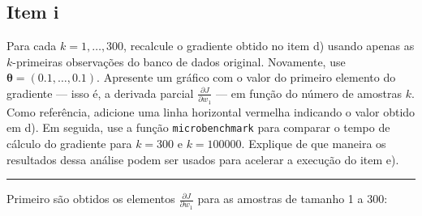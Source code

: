 \documentclass[
  a4paperpaper,
]{article}
\begin{document}
\begin{figure}[H]


\caption{\label{fig-esperado-observado}}

\end{figure}%

\subsection{Item i}\label{item-i}

Para cada \(k = 1,\dots, 300\), recalcule o gradiente obtido no item d)
usando apenas as \(k\)-primeiras observações do banco de dados original.
Novamente, use \(\boldsymbol{\theta} = (0.1, \dots, 0.1)\). Apresente um
gráfico com o valor do primeiro elemento do gradiente --- isso é, a
derivada parcial \(\frac{\partial J}{\partial w_1}\) --- em função do
número de amostras \(k\). Como referência, adicione uma linha horizontal
vermelha indicando o valor obtido em d). Em seguida, use a função
\texttt{microbenchmark} para comparar o tempo de cálculo do gradiente
para \(k = 300\) e \(k = 100000\). Explique de que maneira os resultados
dessa análise podem ser usados para acelerar a execução do item e).

\begin{center}\rule{0.5\linewidth}{0.5pt}\end{center}

Primeiro são obtidos os elementos \(\frac{\partial J}{\partial w_1}\)
para as amostras de tamanho 1 a 300:
\end{document}
